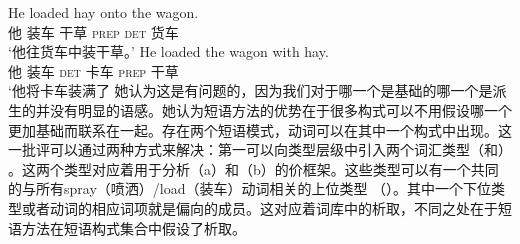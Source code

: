 \begin{exe}
\begin{xlist}[iv.]
\begin{exe}
\begin{xlist}[iv.]
\eal
\ex
\gll He loaded hay onto the wagon.\\
     他 装车 干草 \textsc{prep} \textsc{det} 货车\\
\glt `他往货车中装干草。' 
\ex
\gll He loaded the wagon with hay.\\
     他 装车 \textsc{det} 卡车 \textsc{prep} 干草\\
\glt `他将卡车装满了 
\zl
她认为这是有问题的，因为我们对于哪一个是基础的哪一个是派生的并没有明显的语感。她认为短语方法的优势在于很多构式可以不用假设哪一个更加基础而联系在一起。存在两个短语模式，动词可以在其中一个构式中出现。这一批评可以通过两种方式来解决：第一可以向类型层级中引入两个词汇类型（和） 。这两个类型对应着用于分析（a）和（b）的价框架。这些类型可以有一个共同的与所有spray（喷洒）/load（装车）动词相关的上位类型 （）。其中一个下位类型或者动词的相应词项就是偏向的成员。这对应着词库中的析取，不同之处在于短语方法在短语构式集合中假设了析取。


\end{xlist}
\end{exe}
\end{xlist}
\end{exe}
